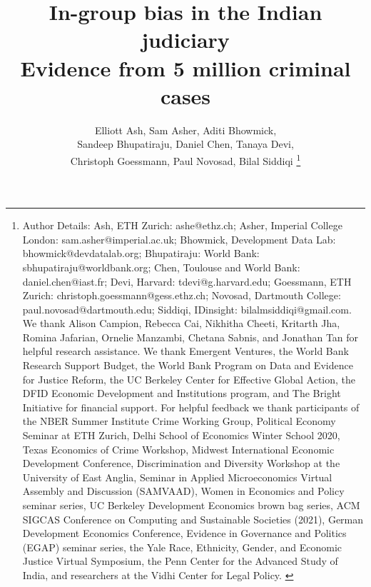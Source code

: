 \documentclass[12pt,english]{article}
\begin{document}
\title{ 
    \vspace{-2.0cm} 
    \textbf{
        In-group bias in the Indian judiciary \\ 
        {\Large Evidence from 5 million criminal cases}
    }
}

\author{
    {\large
        Elliott Ash, Sam Asher, Aditi Bhowmick, \\ 
        Sandeep Bhupatiraju, Daniel Chen, Tanaya Devi,  \\
        Christoph Goessmann, Paul Novosad, Bilal Siddiqi
    \unskip}
    \unskip\thanks{
        {\scriptsize 
            Author Details: Ash, ETH Zurich: ashe@ethz.ch; Asher, Imperial College London: sam.asher@imperial.ac.uk; Bhowmick, Development Data Lab: bhowmick@devdatalab.org;  Bhupatiraju: World Bank: sbhupatiraju@worldbank.org; Chen, Toulouse and World Bank: daniel.chen@iast.fr; Devi, Harvard: tdevi@g.harvard.edu; Goessmann, ETH Zurich: christoph.goessmann@gess.ethz.ch;  Novosad, Dartmouth College: paul.novosad@dartmouth.edu; Siddiqi, IDinsight: bilalmsiddiqi@gmail.com. We thank Alison Campion, Rebecca Cai, Nikhitha Cheeti, Kritarth Jha, Romina Jafarian, Ornelie Manzambi, Chetana Sabnis, and Jonathan Tan for helpful research assistance. We thank Emergent Ventures, the World Bank Research Support Budget, the World Bank Program on Data and Evidence for Justice Reform, the UC Berkeley Center for Effective Global Action, the DFID Economic Development and Institutions program, and The Bright Initiative for financial support. For helpful feedback we thank participants of the NBER Summer Institute Crime Working Group, Political Economy Seminar at ETH Zurich, Delhi School of Economics Winter School 2020, Texas Economics of Crime Workshop, Midwest International Economic Development Conference, Discrimination and Diversity Workshop at the University of East Anglia, Seminar in Applied Microeconomics Virtual Assembly and Discussion (SAMVAAD), Women in Economics and Policy seminar series, UC Berkeley Development Economics brown bag series, ACM SIGCAS Conference on Computing and Sustainable Societies (2021), German Development Economics Conference, Evidence in Governance and Politics (EGAP) seminar series, the Yale Race, Ethnicity, Gender, and Economic Justice Virtual Symposium, the Penn Center for the Advanced Study of India, and researchers at the Vidhi Center for Legal Policy.
        }
    }
}

\maketitle
\end{document}

